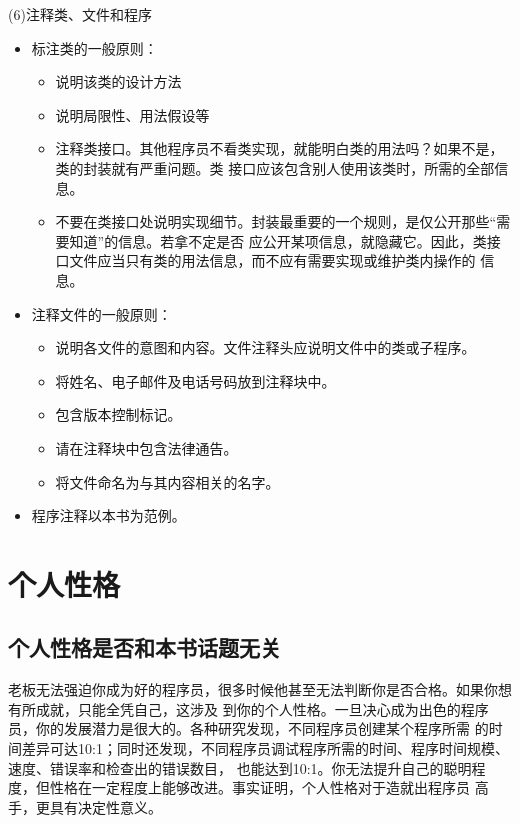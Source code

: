 \documentclass{article}
\begin{document}
\par
(6)注释类、文件和程序
\par
\begin{itemize}
    \item 标注类的一般原则：
    \begin{itemize}
        \item 说明该类的设计方法
        \item 说明局限性、用法假设等
        \item 注释类接口。其他程序员不看类实现，就能明白类的用法吗？如果不是，类的封装就有严重问题。类
        接口应该包含别人使用该类时，所需的全部信息。
        \item 不要在类接口处说明实现细节。封装最重要的一个规则，是仅公开那些“需要知道”的信息。若拿不定是否
        应公开某项信息，就隐藏它。因此，类接口文件应当只有类的用法信息，而不应有需要实现或维护类内操作的
        信息。
    \end{itemize}
    \item 注释文件的一般原则：
    \begin{itemize}
        \item 说明各文件的意图和内容。文件注释头应说明文件中的类或子程序。
        \item 将姓名、电子邮件及电话号码放到注释块中。
        \item 包含版本控制标记。
        \item 请在注释块中包含法律通告。
        \item 将文件命名为与其内容相关的名字。
    \end{itemize}
    \item 程序注释以本书为范例。
\end{itemize}


\section{个人性格}
\subsection{个人性格是否和本书话题无关}
老板无法强迫你成为好的程序员，很多时候他甚至无法判断你是否合格。如果你想有所成就，只能全凭自己，这涉及
到你的个人性格。一旦决心成为出色的程序员，你的发展潜力是很大的。各种研究发现，不同程序员创建某个程序所需
的时间差异可达10:1；同时还发现，不同程序员调试程序所需的时间、程序时间规模、速度、错误率和检查出的错误数目，
也能达到10:1。你无法提升自己的聪明程度，但性格在一定程度上能够改进。事实证明，个人性格对于造就出程序员
高手，更具有决定性意义。
\end{document}
